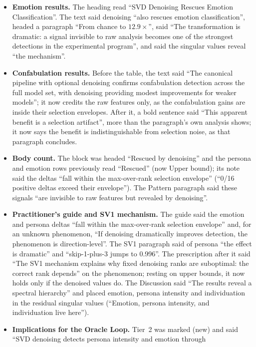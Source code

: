 \documentclass[11pt,a4paper]{article}
\begin{document}
\begin{itemize}[nosep]
  said that the denoising step was ``revealing the layer-specific persona
  signal''.
\item \textbf{Emotion results.} The heading read ``SVD Denoising Rescues
  Emotion Classification''. The text said denoising ``also rescues emotion
  classification'', headed a paragraph ``From chance to $12.9\times$'', said
  ``The transformation is dramatic: a signal invisible to raw analysis
  becomes one of the strongest detections in the experimental program'',
  and said the singular values reveal ``the mechanism''.
\item \textbf{Confabulation results.} Before the table, the text said ``The
  canonical pipeline with optional denoising confirms confabulation
  detection across the full model set, with denoising providing modest
  improvements for weaker models''; it now credits the raw features only, as
  the confabulation gains are inside their selection envelopes. After it, a
  bold sentence said ``This apparent benefit is a selection artifact'', more
  than the paragraph's own analysis shows; it now says the benefit is
  indistinguishable from selection noise, as that paragraph concludes.
\item \textbf{Body count.} The block was headed ``Rescued by denoising'' and
  the persona and emotion rows previously read ``Rescued'' (now Upper bound); its note said
  the deltas ``fall within the max-over-rank selection envelope'' (``0/16
  positive deltas exceed their envelope''). The Pattern paragraph said these
  signals ``are invisible to raw features but revealed by denoising''.
\item \textbf{Practitioner's guide and SV1 mechanism.} The guide said the
  emotion and persona deltas ``fall within the max-over-rank selection
  envelope'' and, for an unknown phenomenon, ``If denoising dramatically
  improves detection, the phenomenon is direction-level''. The SV1 paragraph
  said of persona ``the effect is dramatic'' and ``skip-1-plus-3 jumps to
  0.996''. The prescription after it said ``The SV1 mechanism explains why
  fixed denoising ranks are suboptimal: the correct rank depends'' on the
  phenomenon; resting on upper bounds, it now holds only if the denoised
  values do. The Discussion said ``The results reveal a spectral hierarchy''
  and placed emotion, persona intensity and individuation in the residual
  singular values (``Emotion, persona intensity, and individuation live
  here'').
\item \textbf{Implications for the Oracle Loop.} Tier~2 was marked (new)
  and said ``SVD denoising detects persona intensity and emotion through

\end{itemize}
\end{document}
